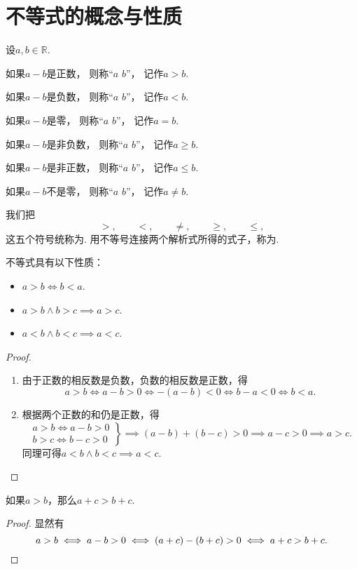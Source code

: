 \section{不等式的概念与性质}
\begin{definition}
设\(a,b\in\mathbb{R}\).

如果\(a-b\)是正数，
则称“\(a\)  \(b\)”，
记作\(a>b\).

如果\(a-b\)是负数，
则称“\(a\)  \(b\)”，
记作\(a<b\).

如果\(a-b\)是零，
则称“\(a\)  \(b\)”，
记作\(a=b\).

如果\(a-b\)是非负数，
则称“\(a\)  \(b\)”，
记作\(a \geq b\).

如果\(a-b\)是非正数，
则称“\(a\)  \(b\)”，
记作\(a \leq b\).

如果\(a-b\)不是零，
则称“\(a\)  \(b\)”，
记作\(a \neq b\).

我们把\[
	>, \qquad
	<, \qquad
	\neq, \qquad
	\geq, \qquad
	\leq,
\]这五个符号统称为.
用不等号连接两个解析式所得的式子，称为.
\end{definition}

\begin{property}
不等式具有以下性质：\begin{itemize}
	\item \(a>b \iff b<a\).
	\item \(a>b \land b>c \implies a>c\).
	\item \(a<b \land b<c \implies a<c\).
\end{itemize}
\begin{proof}
\begin{enumerate}
\item 由于正数的相反数是负数，负数的相反数是正数，得\[
a > b \iff a-b > 0 \iff -(a-b) < 0 \iff b-a < 0 \iff b < a.
\]
\item 根据两个正数的和仍是正数，得\[
\left. \begin{array}{c}
a > b \iff a-b > 0 \\
b > c \iff b-c > 0
\end{array} \right\}
\implies (a-b)+(b-c) > 0
\implies a-c > 0
\implies a > c.
\]同理可得\(a<b \land b<c \implies a<c\).
\qedhere
\end{enumerate}
\end{proof}
\end{property}

\begin{theorem}
如果\(a>b\)，那么\(a+c>b+c\).
\begin{proof}
显然有\[
a>b
\iff a-b>0
\iff (a+c)-(b+c)>0
\iff a+c>b+c.
\qedhere
\]
\end{proof}
\end{theorem}

